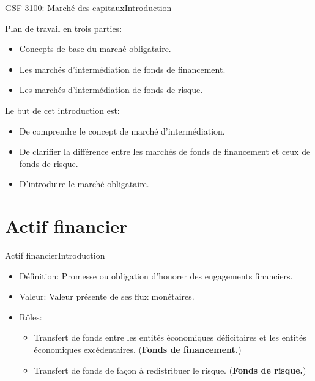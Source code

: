 \documentclass{beamer}
\begin{document}
\begin{frame}{GSF-3100: Marché des capitaux}{Introduction}
  \begin{block}{Plan de travail en trois parties:}
\begin{itemize}
\item Concepts de base du marché obligataire.
\item Les marchés d'intermédiation de fonds de financement.
\item Les marchés d’intermédiation de fonds de risque.
\end{itemize}
  \end{block}
  
  \begin{block}{Le but de cet introduction est:}
\begin{itemize}
\item De comprendre le concept de marché d’intermédiation.
\item De clarifier la différence entre les marchés de fonds de financement et ceux de fonds de risque.
\item D’introduire le marché obligataire.
\end{itemize}
  \end{block}
\end{frame}

\section{Actif financier}
\begin{frame}{Actif financier}{Introduction}
\begin{itemize}
\item Définition: Promesse ou obligation d’honorer des engagements financiers.
\item Valeur: Valeur présente de ses flux monétaires.
\item  Rôles:
\begin{itemize}
\item Transfert de fonds entre les entités économiques déficitaires et les entités économiques excédentaires.  (\textbf{Fonds de financement.})
\vspace{0.5cm}
\item Transfert de fonds de façon à redistribuer le
risque.  (\textbf{Fonds de risque.})
\end{itemize}
\end{itemize}
\end{frame}
\end{document}
